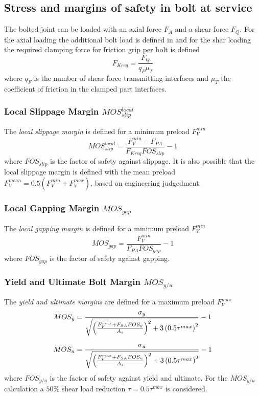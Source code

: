 \subsection{Stress and margins of safety in bolt at service}
The bolted joint can be loaded with an axial force $F_A$ and a shear force $F_Q$. For
the axial loading the additional bolt load is defined in  and for the shar loading
the required clamping force for friction grip per bolt is defined 
\begin{equation}
  F_{Kreq} = \frac{F_Q}{q_F \mu_T}
\end{equation}
where $q_F$ is the number of shear force transmitting interfaces and $\mu_T$ the coefficient of 
friction in the clamped part interfaces. 
\subsubsection{Local Slippage Margin $MOS_{slip}^{local}$}
The \emph{local slippage margin} is defined for a minimum preload $F_V^{min}$
\begin{equation}
  MOS_{slip}^{local} = \frac{F_V^{min}-F_{PA}}{F_{Kreq} FOS_{slip}}-1
\end{equation}
where $FOS_{slip}$ is the factor of safety against slippage. It is also possible that the local slippage 
margin is defined with the mean preload $F_V^{mean} = 0.5 (F_V^{min}+F_V^{max})$, based on engineering
judgedment. 
\subsubsection{Local Gapping Margin $MOS_{gap}$}
The \emph{local gapping margin} is defined for a minimum preload $F_V^{min}$
\begin{equation}
  MOS_{gap} = \frac{F_V^{min}}{F_{PA} FOS_{gap}}-1
\end{equation}
where $FOS_{gap}$ is the factor of safety against gapping. 
\subsubsection{Yield and Ultimate Bolt Margin $MOS_{y/u}$}
The \emph{yield and ultimate margins} are defined for a maximum preload $F_V^{max}$ 
\begin{subequations}
  \setlength{\jot}{10pt}
  \begin{align}
    MOS_{y} &= \frac{\sigma_y}{\sqrt{\left(\frac{F_V^{max}+F_{SA} FOS_y}{A_s}\right)^2 + 
      3\left(0.5 \tau^{max}\right)^2}}-1 \\
    MOS_{u} &= \frac{\sigma_u}{\sqrt{\left(\frac{F_V^{max}+F_{SA} FOS_u}{A_s}\right)^2 + 
      3\left(0.5 \tau^{max}\right)^2}}-1
  \end{align}
\end{subequations}
where $FOS_{y/u}$ is the factor of safety against yield and ultimate. For the $MOS_{y/u}$ calculation
a $50\%$ shear load reduction $\tau = 0.5 \tau^{max}$ is considered\footnotemark[2]
.
